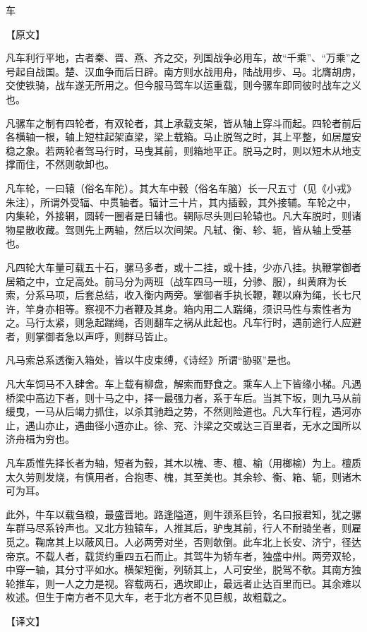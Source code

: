 \documentclass[12pt,UTF8]{ctexbook}
\begin{document}
车

【原文】

凡车利行平地，古者秦、晋、燕、齐之交，列国战争必用车，故“千乘”、“万乘”之号起自战国。楚、汉血争而后日辟。南方则水战用舟，陆战用步、马。北膺胡虏，交使铁骑，战车遂无所用之。但今服马驾车以运重载，则今骡车即同彼时战车之义也。

凡骡车之制有四轮者，有双轮者，其上承载支架，皆从轴上穿斗而起。四轮者前后各横轴一根，轴上短柱起架直梁，梁上载箱。马止脱驾之时，其上平整，如居屋安稳之象。若两轮者驾马行时，马曳其前，则箱地平正。脱马之时，则以短木从地支撑而住，不然则欹卸也。

凡车轮，一曰辕（俗名车陀）。其大车中毂（俗名车脑）长一尺五寸（见《小戎》朱注），所谓外受辐、中贯轴者。辐计三十片，其内插毂，其外接辅。车轮之中，内集轮，外接辋，圆转一圈者是日辅也。辋际尽头则曰轮辕也。凡大车脱时，则诸物星散收藏。驾则先上两轴，然后以次间架。凡轼、衡、轸、轭，皆从轴上受基也。

凡四轮大车量可载五十石，骡马多者，或十二挂，或十挂，少亦八挂。执鞭掌御者居箱之中，立足高处。前马分为两班（战车四马一班，分骖、服），纠黄麻为长索，分系马项，后套总结，收入衡内两旁。掌御者手执长鞭，鞭以麻为绳，长七尺许，竿身亦相等。察视不力者鞭及其身。箱内用二人踹绳，须识马性与索性者为之。马行太紧，则急起踹绳，否则翻车之祸从此起也。凡车行时，遇前途行人应避者，则掌御者急以声呼，则群马皆止。

凡马索总系透衡入箱处，皆以牛皮束缚，《诗经》所谓“胁驱”是也。

凡大车饲马不入肆舍。车上载有柳盘，解索而野食之。乘车人上下皆缘小梯。凡遇桥梁中高边下者，则十马之中，择一最强力者，系于车后。当其下坂，则九马从前缓曳，一马从后竭力抓住，以杀其驰趋之势，不然则险道也。凡大车行程，遇河亦止，遇山亦止，遇曲径小道亦止。徐、兖、汴梁之交或达三百里者，无水之国所以济舟楫为穷也。

凡车质惟先择长者为轴，短者为毂，其木以槐、枣、檀、榆（用榔榆）为上。檀质太久劳则发烧，有慎用者，合抱枣、槐，其至美也。其余轸、衡、箱、轭，则诸木可为耳。

此外，牛车以载刍粮，最盛晋地。路逢隘道，则牛颈系巨铃，名曰报君知，犹之骡车群马尽系铃声也。又北方独辕车，人推其后，驴曳其前，行人不耐骑坐者，则雇觅之。鞠席其上以蔽风日。人必两旁对坐，否则欹倒。此车北上长安、济宁，径达帝京。不载人者，载货约重四五石而止。其驾牛为轿车者，独盛中州。两旁双轮，中穿一轴，其分寸平如水。横架短衡，列轿其上，人可安坐，脱驾不欹。其南方独轮推车，则一人之力是视。容载两石，遇坎即止，最远者止达百里而已。其余难以枚述。但生于南方者不见大车，老于北方者不见巨舰，故粗载之。

【译文】
\end{document}
